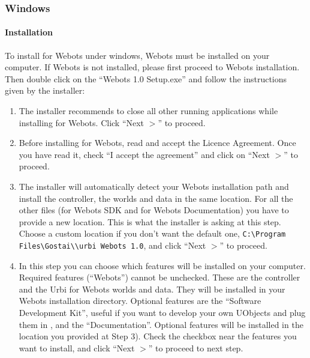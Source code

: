 \subsubsection{Windows}
\label{webots.setup.windows}%

\paragraph{Installation}
\label{webots.setup.windows.installation}%

To install \urbi for Webots under windows, Webots must be installed on
your computer. If Webots is not installed, please first proceed to
Webots installation. Then double click on the ``\urbi Webots 1.0
Setup.exe'' and follow the instructions given by the installer:

\begin{enumerate}
\item The installer recommends to close all other running applications
  while installing \urbi for Webots. Click ``Next $>$'' to proceed.

\item Before installing \urbi for Webots, read and accept the Licence
  Agreement. Once you have read it, check ``I accept the agreement'' and
  click on ``Next $>$'' to proceed.

\item The installer will automatically detect your Webots installation
  path and install the \urbi controller, the worlds and data in the
  same location. For all the other files (\urbi for Webots SDK and
  \urbi for Webots Documentation) you have to provide a new
  location. This is what the installer is asking at this step. Choose
  a custom location if you don't want the default one,
  \nolinkurl{C:\Program Files\Gostai\\urbi Webots 1.0}, and click
  ``Next $>$'' to proceed.

\item In this step you can choose which features will be installed on
  your computer. Required features (``\urbi Webots'') cannot be
  unchecked. These are the \urbi controller and the Urbi for Webots
  worlds and data. They will be installed in your Webots installation
  directory. Optional features are the ``\urbi Software Development
  Kit'', useful if you want to develop your own UObjects and plug them
  in \urbi, and the ``\urbi Documentation''. Optional features will be
  installed in the location you provided at Step 3).  Check the
  checkbox near the features you want to install, and click ``Next $>$''
  to proceed to next step.


\end{enumerate}
